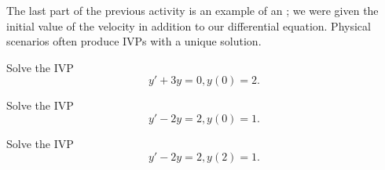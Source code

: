 \begin{applicationActivities}
\begin{definition}
The last part of the previous activity is an example of an ; we were given the initial value of the velocity in addition to our differential equation.
\vfill
Physical scenarios often produce IVPs with a unique solution.
\end{definition}

\begin{activity}{10}
Solve the IVP
\[y'+3y=0, y(0)=2.\]
\end{activity}

\begin{activity}{10}
Solve the IVP
\[y'-2y=2, y(0)=1.\]
\end{activity}

\begin{activity}{5}
Solve the IVP
\[y'-2y=2, y(2)=1.\]
\end{activity}




\end{applicationActivities}
